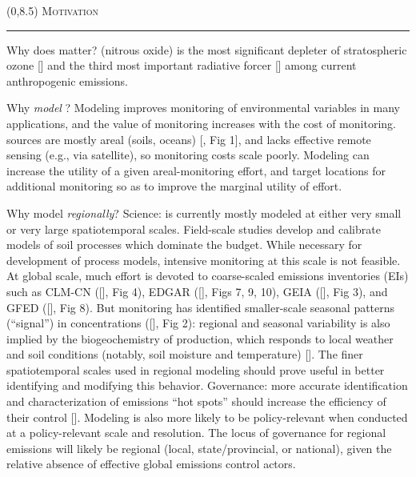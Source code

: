 \documentclass{a0poster} %
\renewcommand{\LARGE}{\fontsize{51.6}{54}\selectfont}
\def\LHead#1{\noindent\hbox{{\LARGE\color{DarkBlue}\textsc{#1}}}\vspace*{-7.6mm}\newline\rule{\textwidth}{5pt}}
\begin{document}
\begin{textblock}{45}(0,8.5)     %
    \LHead{Motivation}
        {\color{Red}Why does  matter?}  (nitrous oxide) is the most significant depleter of stratospheric ozone [\citet{ravishankara_nitrous_2009}] and the third most important radiative forcer [\citet{butler_noaa_2012}] among current anthropogenic emissions.

        {\color{Red}Why \textit{model} ?} Modeling improves monitoring of environmental variables in many applications, and the value of monitoring increases with the cost of monitoring.  sources are mostly areal (soils, oceans) [\citet{thomson_biological_2012}, Fig 1], and  lacks effective remote sensing (e.g., via satellite), so  monitoring costs scale poorly. Modeling can increase the utility of a given areal-monitoring effort, and target locations for additional monitoring so as to improve the marginal utility of effort. 

        {\color{Red}Why model  \textit{regionally}?} {\color{Red}Science:}  is currently mostly modeled at either very small or very large spatiotemporal scales. Field-scale studies develop and calibrate models of soil processes which dominate the  budget. While necessary for development of process models, intensive monitoring at this scale is not feasible. At global scale, much effort is devoted to coarse-scaled emissions inventories (EIs) such as CLM-CN ([\citet{oleson_clm3.5_2007}], Fig 4), EDGAR ([\citet{european_commission_joint_research_centre_jrc_emission_2011}], Figs 7, 9, 10), GEIA ([\citet{bouwman_uncertainties_1995}], Fig 3), and GFED ([\citet{van_der_werf_global_2010}], Fig 8). But monitoring has identified smaller-scale seasonal patterns (``signal'') in  concentrations ([\citet{miller_regional_2012}], Fig 2): regional and seasonal variability is also implied by the biogeochemistry of  production, which responds to local weather and soil conditions (notably, soil moisture and temperature) [\citet{smith_effects_1998}]. The finer spatiotemporal scales used in regional modeling should prove useful in better identifying and modifying this behavior. {\color{Red}Governance:} more accurate identification and characterization of emissions ``hot spots'' should increase the efficiency of their control [\citet{eagle_Greenhouse_Gas_Mitigation_2012}]. Modeling is also more likely to be policy-relevant when conducted at a policy-relevant scale and resolution. The locus of governance for regional emissions will likely be regional (local, state/provincial, or national), given the relative absence of effective global emissions control actors.


\end{textblock}
\end{document}
